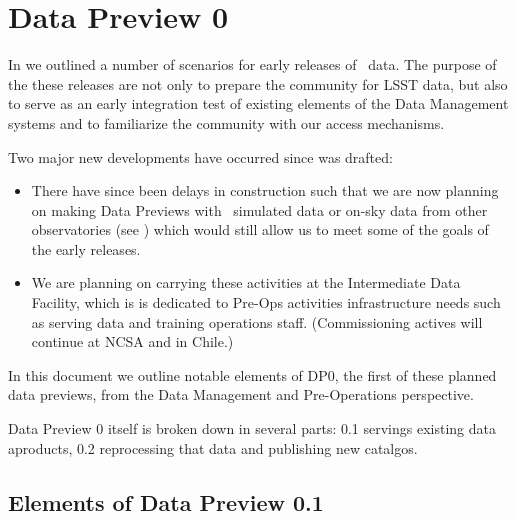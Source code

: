 \section{Data Preview 0}\label{sec:dp0}

In  we outlined a number of scenarios for early releases of \RO~data. The purpose of the these releases are not only to prepare the community for LSST data, but also to serve as an early integration test of existing elements of the Data Management systems and to familiarize the community with our access mechanisms.

Two major new developments have occurred since  was drafted:

\begin{itemize}

\item There have since been delays in construction such that we are now planning on making Data Previews with \RO~simulated data or on-sky data from other observatories (see ) which would still allow us to meet some of the goals of the early releases.

\item We are planning on carrying these activities at the Intermediate Data Facility, which is is dedicated to Pre-Ops activities infrastructure needs such as serving data and training operations staff. (Commissioning actives will continue at NCSA and in Chile.)

\end{itemize}

In this document we outline notable elements of DP0, the first of these planned data previews, from the Data Management and Pre-Operations perspective.

Data Preview 0 itself is broken down in several parts: 0.1 servings existing data aproducts, 0.2 reprocessing that data and publishing new catalgos.

\subsection{Elements of Data Preview 0.1}


